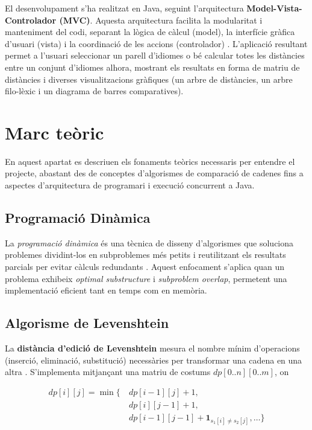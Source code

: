 \documentclass{ieeetj}
\begin{document}
El desenvolupament s’ha realitzat en Java, seguint l’arquitectura \textbf{Model-Vista-Controlador (MVC)}. Aquesta arquitectura facilita la modularitat i manteniment del codi, separant la lògica de càlcul (model), la interfície gràfica d’usuari (vista) i la coordinació de les accions (controlador) \cite{MVC_Theory}\cite{mvcPattern}. \newline L’aplicació resultant permet a l’usuari seleccionar un parell d’idiomes o bé calcular totes les distàncies entre un conjunt d’idiomes alhora, mostrant els resultats en forma de matriu de distàncies i diverses visualitzacions gràfiques (un arbre de distàncies, un arbre filo-lèxic i un diagrama de barres comparatives).


\section{Marc teòric} 
En aquest apartat es descriuen els fonaments teòrics necessaris per entendre el projecte, abastant des de conceptes d’algorismes de comparació de cadenes fins a aspectes d’arquitectura de programari i execució concurrent a Java.

\subsection{Programació Dinàmica}
La \emph{programació dinàmica} és una tècnica de disseny d’algorismes que soluciona problemes dividint-los en subproblemes més petits i reutilitzant els resultats parcials per evitar càlculs redundants \cite{DPConcept}.  
Aquest enfocament s’aplica quan un problema exhibeix \emph{optimal substructure} i \emph{subproblem overlap}, permetent una implementació eficient tant en temps com en memòria.

\subsection{Algorisme de Levenshtein}
La \textbf{distància d’edició de Levenshtein} mesura el nombre mínim d’operacions (inserció, eliminació, substitució) necessàries per transformar una cadena en una altra \cite{levDistanceWiki}.  
S’implementa mitjançant una matriu de costums \(dp[0..n][0..m]\), on

\[
\begin{aligned}
dp[i][j] = \min \bigl\{ &\ dp[i-1][j] + 1,\; \\
                        &\ dp[i][j-1] + 1,\; \\
                        &\ dp[i-1][j-1] + \mathbf{1}_{s_1[i]\neq s_2[j]}, \dots
\bigr\}
\end{aligned}
\]
\end{document}
